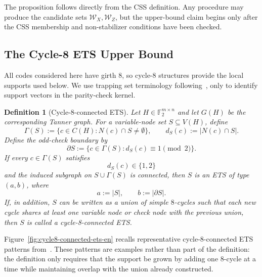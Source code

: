 \documentclass[11pt]{article}
\newcommand{\Ftwo}{\mathbb{F}_2}
\newcommand{\markededit}[1]{#1}
\theoremstyle{uprightthm}
\newtheorem{definition}[theorem]{Definition}
\begin{document}
The proposition \markededit{follows directly} from the CSS
definition.  Any procedure may produce the candidate sets
$\mathcal W_X,\mathcal W_Z$, but the upper-bound claim begins only after the
CSS membership and non-stabilizer conditions have been \markededit{checked}.

\subsection{The Cycle-8 ETS Upper Bound}
\label{sec:cycle8-ets-en}
All codes considered here have girth $8$, so cycle-8 structures provide the
local supports \markededit{used below}.  We use trapping set terminology
following~\cite{KarimiBanihashemi2012,HashemiBanihashemi2016}, only to \markededit{identify}
support vectors in the parity-check kernel.

\begin{definition}[Cycle-8-connected ETS]
\label{def:cycle8-ets-en}
Let $H\in\Ftwo^{m\times n}$ and let $G(H)$ be the corresponding Tanner graph. For a variable-node set $S\subseteq V(H)$, define
\[
\Gamma(S):=\{c\in C(H):N(c)\cap S\neq\emptyset\},
\qquad
d_S(c):=|N(c)\cap S|.
\]
Define the odd-check boundary by
\[
\partial S:=\{c\in\Gamma(S):d_S(c)\equiv 1\pmod 2\}.
\]
If every $c\in\Gamma(S)$ satisfies
\[
d_S(c)\in\{1,2\}
\]
and the induced subgraph on $S\cup\Gamma(S)$ is connected, then $S$ is an ETS of type $(a,b)$, where
\[
a:=|S|,\qquad b:=|\partial S|.
\]
If, in addition, $S$ can be written as a union of simple $8$-cycles such that each new cycle shares at least one variable node or check node with the previous union, then $S$ is called a \emph{cycle-8-connected ETS}.
\end{definition}

Figure~\ref{fig:cycle8-connected-ets-en} recalls representative
cycle-8-connected ETS patterns from~\cite{Kasai2026}.  These patterns are
examples rather than part of the definition: the definition only requires that
the support be grown by adding one 8-cycle at a time while maintaining overlap
with the union already constructed.
\end{document}
